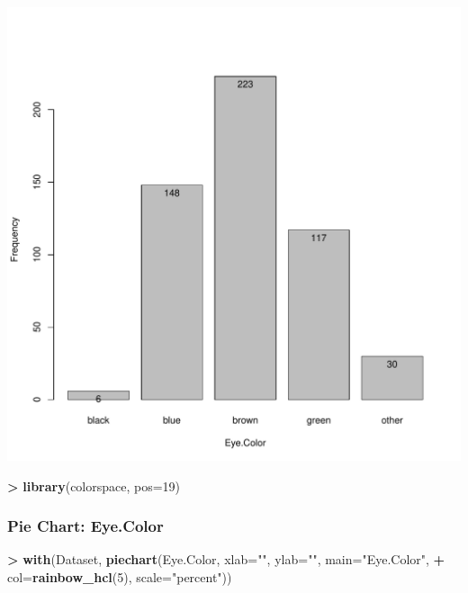 \documentclass[
]{article}
\newenvironment{Shaded}{\begin{snugshade}}{\end{snugshade}}
\newcommand{\AttributeTok}[1]{\textcolor[rgb]{0.13,0.29,0.53}{#1}}
\newcommand{\DecValTok}[1]{\textcolor[rgb]{0.00,0.00,0.81}{#1}}
\newcommand{\FunctionTok}[1]{\textcolor[rgb]{0.13,0.29,0.53}{\textbf{#1}}}
\newcommand{\NormalTok}[1]{#1}
\newcommand{\SpecialCharTok}[1]{\textcolor[rgb]{0.81,0.36,0.00}{\textbf{#1}}}
\newcommand{\StringTok}[1]{\textcolor[rgb]{0.31,0.60,0.02}{#1}}
\begin{document}
\includegraphics[width=750px]{RcmdrMarkdown_files/figure-latex/unnamed-chunk-18-1}

\begin{Shaded}
\begin{Highlighting}[]
\SpecialCharTok{\textgreater{}} \FunctionTok{library}\NormalTok{(colorspace, }\AttributeTok{pos=}\DecValTok{19}\NormalTok{)}
\end{Highlighting}
\end{Shaded}

\subsubsection{Pie Chart: Eye.Color}\label{pie-chart-eye.color}

\begin{Shaded}
\begin{Highlighting}[]
\SpecialCharTok{\textgreater{}} \FunctionTok{with}\NormalTok{(Dataset, }\FunctionTok{piechart}\NormalTok{(Eye.Color, }\AttributeTok{xlab=}\StringTok{""}\NormalTok{, }\AttributeTok{ylab=}\StringTok{""}\NormalTok{, }\AttributeTok{main=}\StringTok{"Eye.Color"}\NormalTok{, }
\SpecialCharTok{+}   \AttributeTok{col=}\FunctionTok{rainbow\_hcl}\NormalTok{(}\DecValTok{5}\NormalTok{), }\AttributeTok{scale=}\StringTok{"percent"}\NormalTok{))}
\end{Highlighting}
\end{Shaded}
\end{document}
